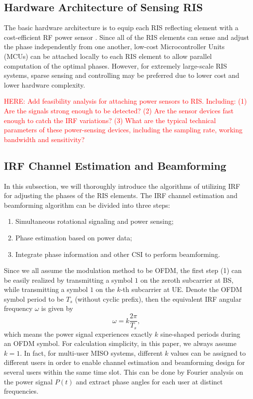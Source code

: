 \documentclass[12pt,draftclsnofoot,journal,onecolumn]{IEEEtran}
\theoremstyle{nonumberplain}
\begin{document}
\subsection{Hardware Architecture of Sensing RIS} \label{Hardware Architecture of Sensing RIS}
The basic hardware architecture is to equip each RIS reflecting element with a cost-efficient RF power sensor \cite{ma2020smartsensing}. Since all of the RIS elements can sense and adjust the phase independently from one another, low-cost Microcontroller Units (MCUs) can be attached locally to each RIS element to allow parallel computation of the optimal phases. However, for extremely large-scale RIS systems, sparse sensing and controlling may be preferred due to lower cost and lower hardware complexity. 

\textcolor{red}{HERE: Add feasibility analysis for attaching power sensors to RIS. Including: (1) Are the signals strong enough to be detected? (2) Are the sensor devices fast enough to catch the IRF variations? (3) What are the typical technical parameters of these power-sensing devices, including the sampling rate, working bandwidth and sensitivity?}

\subsection{IRF Channel Estimation and Beamforming} \label{IRF Channel Estimation and Beamforming}
    In this subsection, we will thoroughly introduce the algorithms of utilizing \ac{IRF} for adjusting the phases of the RIS elements. The \ac{IRF} channel estimation and beamforming algorithm can be divided into three steps:
    \begin{enumerate}
        \item Simultaneous rotational signaling and power sensing; 
        \item Phase estimation based on power data;
        \item Integrate phase information and other CSI to perform beamforming. 
    \end{enumerate} 
    Since we all assume the modulation method to be OFDM, the first step (1) can be easily realized by transmitting a symbol $1$ on the zeroth subcarrier at BS, while transmitting a symbol $1$ on the $k$-th subcarrier at UE. Denote the OFDM symbol period to be $T_s$ (without cyclic prefix), then the equivalent IRF angular frequency $\omega$ is given by 
    \begin{equation}
        \omega = k \frac{2\pi}{T_s},
    \end{equation}
    which means the power signal experiences exactly $k$ sine-shaped periods during an OFDM symbol. For calculation simplicity, in this paper, we always assume $k=1$. In fact, for multi-user MISO systems, different $k$ values can be assigned to different users in order to enable channel estimation and beamforming design for several users within the same time slot. This can be done by Fourier analysis on the power signal $P(t)$ and extract phase angles for each user at distinct frequencies. 
\end{document}
